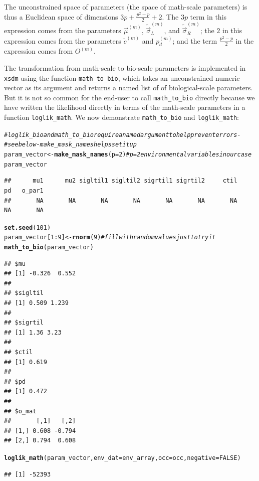 \documentclass[11pt]{article}\usepackage[]{graphicx}\usepackage[]{xcolor}
\makeatletter
\newcommand{\hlnum}[1]{\textcolor[rgb]{0.686,0.059,0.569}{#1}}%
\newcommand{\hlcom}[1]{\textcolor[rgb]{0.678,0.584,0.686}{\textit{#1}}}%
\newcommand{\hlopt}[1]{\textcolor[rgb]{0,0,0}{#1}}%
\newcommand{\hldef}[1]{\textcolor[rgb]{0.345,0.345,0.345}{#1}}%
\newcommand{\hlkwb}[1]{\textcolor[rgb]{0.69,0.353,0.396}{#1}}%
\newcommand{\hlkwc}[1]{\textcolor[rgb]{0.333,0.667,0.333}{#1}}%
\newcommand{\hlkwd}[1]{\textcolor[rgb]{0.737,0.353,0.396}{\textbf{#1}}}%
\newenvironment{kframe}{%
 \def\at@end@of@kframe{}%
 \ifinner\ifhmode%
  \def\at@end@of@kframe{\end{minipage}}%
  \begin{minipage}{\columnwidth}%
 \fi\fi%
 \def\FrameCommand##1{\hskip\@totalleftmargin \hskip-\fboxsep
 \colorbox{shadecolor}{##1}\hskip-\fboxsep
     \hskip-\linewidth \hskip-\@totalleftmargin \hskip\columnwidth}%
 \MakeFramed {\advance\hsize-\width
   \@totalleftmargin\z@ \linewidth\hsize
   \@setminipage}}%
 {\par\unskip\endMakeFramed%
 \at@end@of@kframe}
\newenvironment{knitrout}{}{} %
\makeatother
\begin{document}
The unconstrained space of parameters (the space of math-scale parameters) 
is thus a Euclidean space of dimensions $3p+\frac{p^2-p}{2}+2$. 
The $3p$ term in this expression comes from the parameters $\vec{\mu}^{(m)}$,
$\tilde{\vec{\sigma}}_L^{(m)}$, and $\tilde{\vec{\sigma}}_R^{(m)}$;
the $2$ in this expression comes from the parameters $\tilde{c}^{(m)}$ and
$p_d^{(m)}$; and the term $\frac{p^2-p}{2}$ in the expression comes from
$O^{(m)}$.

The transformation from math-scale to bio-scale parameters is implemented
in \texttt{xsdm} using the function \texttt{math\_to\_bio}, which takes an unconstrained
numeric vector as its argument and returns a named list of of biological-scale
parameters. But it is not so common for the end-user to call \texttt{math\_to\_bio}
directly because we have written the likelihood directly in terms of the math-scale
parameters in a function \texttt{loglik\_math}. We now demonstrate \texttt{math\_to\_bio}
and \texttt{loglik\_math}:
\begin{knitrout}
\color{fgcolor}\begin{kframe}
\begin{alltt}
\hlcom{#loglik_bio and math_to_bio require a named argument to help prevent errors - }
\hlcom{#see below - make_mask_names helps set it up}
\hldef{param_vector} \hlkwb{<-} \hlkwd{make_mask_names}\hldef{(}\hlkwc{p} \hldef{=} \hlnum{2}\hldef{)} \hlcom{#p = 2 environmental variables in our case}
\hldef{param_vector}
\end{alltt}
\begin{verbatim}
##      mu1      mu2 sigltil1 sigltil2 sigrtil1 sigrtil2     ctil       pd   o_par1 
##       NA       NA       NA       NA       NA       NA       NA       NA       NA
\end{verbatim}
\begin{alltt}
\hlkwd{set.seed}\hldef{(}\hlnum{101}\hldef{)}
\hldef{param_vector[}\hlnum{1}\hlopt{:}\hlnum{9}\hldef{]} \hlkwb{<-} \hlkwd{rnorm}\hldef{(}\hlnum{9}\hldef{)} \hlcom{#fill with random values just to try it}
\hlkwd{math_to_bio}\hldef{(param_vector)}
\end{alltt}
\begin{verbatim}
## $mu
## [1] -0.326  0.552
## 
## $sigltil
## [1] 0.509 1.239
## 
## $sigrtil
## [1] 1.36 3.23
## 
## $ctil
## [1] 0.619
## 
## $pd
## [1] 0.472
## 
## $o_mat
##       [,1]   [,2]
## [1,] 0.608 -0.794
## [2,] 0.794  0.608
\end{verbatim}
\begin{alltt}
\hlkwd{loglik_math}\hldef{(param_vector,} \hlkwc{env_dat} \hldef{= env_array,} \hlkwc{occ} \hldef{= occ,} \hlkwc{negative} \hldef{=} \hlnum{FALSE}\hldef{)}
\end{alltt}
\begin{verbatim}
## [1] -52393
\end{verbatim}
\end{kframe}
\end{knitrout}
\end{document}
